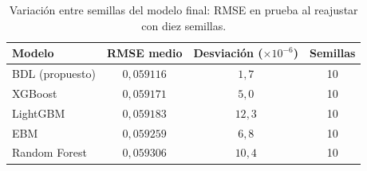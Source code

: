 \begin{table}[tbp]
  \centering\scriptsize\setlength{\tabcolsep}{3pt}
  \caption{Variación entre semillas del modelo final: RMSE en prueba al reajustar con diez semillas.}
  \label{tab:semillas}
  \begin{tabular}{lccc}
    \toprule
    Modelo & RMSE medio & Desviación ($\times 10^{-6}$) & Semillas \\
    \midrule
    BDL (propuesto) & $0{,}059116$ & $1{,}7$ & 10 \\
    XGBoost & $0{,}059171$ & $5{,}0$ & 10 \\
    LightGBM & $0{,}059183$ & $12{,}3$ & 10 \\
    EBM & $0{,}059259$ & $6{,}8$ & 10 \\
    Random Forest & $0{,}059306$ & $10{,}4$ & 10 \\
    \bottomrule
  \end{tabular}
\end{table}
